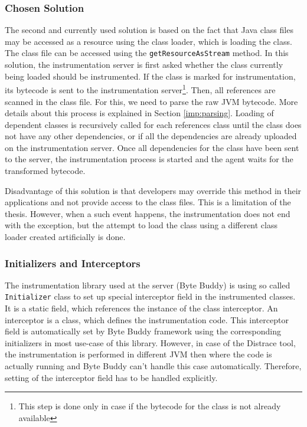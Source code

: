\subsubsection{Chosen Solution}
The second and currently used solution is based on the fact that Java class files may be accessed as a resource using the class loader, which is loading the class. The class file can be accessed using the \texttt{getResourceAsStream} method. In this solution, the instrumentation server is first asked whether the class currently being loaded should be instrumented. If the class is marked for instrumentation, its bytecode is sent to the instrumentation server\footnote{This step is done only in case if the bytecode for the class is not already available}. Then, all references are scanned in the class file. For this, we need to parse the raw JVM bytecode. More details about this process is explained in Section \ref{imp:parsing}. Loading of dependent classes is recursively called for each references class until the class does not have any other dependencies, or if all the dependencies are already uploaded on the instrumentation server. Once all dependencies for the class have been sent to the server, the instrumentation process is started and the agent waits for the transformed bytecode. 

Disadvantage of this solution is that developers may override this method in their applications and not provide access to the class files. This is a limitation of the thesis. However, when a such event happens, the instrumentation does not end with the exception, but the attempt to load the class using a different class loader created artificially is done. 

\subsubsection{Initializers and Interceptors}
The instrumentation library used at the server (Byte Buddy) is using so called \texttt{Initializer} class to set up special interceptor field in the instrumented classes. It is a static field, which references the instance of the class interceptor. An interceptor is a class, which defines the instrumentation code. This interceptor field is automatically set by Byte Buddy framework using the corresponding initializers in most use-case of this library. However, in case of the Distrace tool, the instrumentation is performed in different JVM then where the code is actually running and Byte Buddy can't handle this case automatically. Therefore, setting of the interceptor field has to be handled explicitly.

